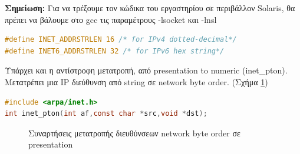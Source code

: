 {\color{red}\textbf{Σημείωση:} Για να τρέξουμε τον κώδικα του εργαστηρίου σε περιβάλλον Solaris, θα πρέπει να βάλουμε στο gcc τις παραμέτρους -lsocket και -lnsl}


\begin{lstlisting}[language=C,breaklines=true, basicstyle=\scriptsize\ttfamily]
#define INET_ADDRSTRLEN 16 /* for IPv4 dotted-decimal*/
#define INET6_ADDRSTRLEN 32 /* for IPv6 hex string*/
\end{lstlisting}

Υπάρχει και η αντίστροφη μετατροπή, από presentation to numeric (inet\_pton). Μετατρέπει μια IP διεύθυνση από string σε network byte order. (Σχήμα \ref{pton})

\begin{lstlisting}[language=C,breaklines=true, basicstyle=\scriptsize\ttfamily]
#include <arpa/inet.h>
int inet_pton(int af,const char *src,void *dst); 
\end{lstlisting}



\begin{figure}[!h]
	\centering
	\caption{Συναρτήσεις μετατροπής διευθύνσεων network byte order σε presentation}
	\label{pton}
\end{figure} 

